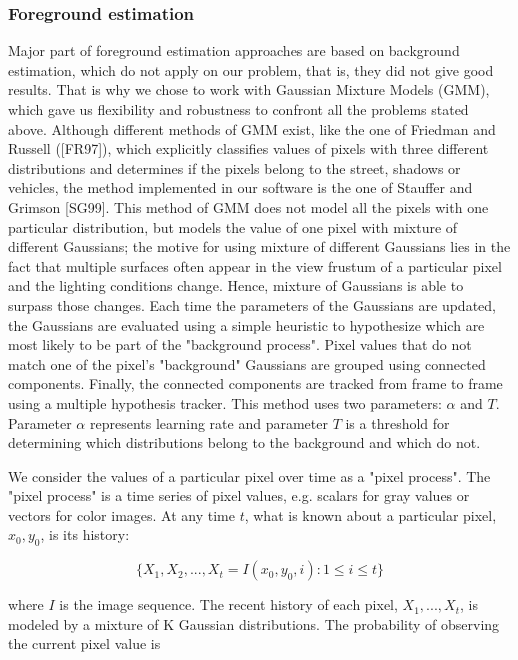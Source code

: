\documentclass[12pt]{article} %
\begin{document}
\subsubsection{Foreground estimation}

Major part of foreground estimation approaches are based on background estimation, which do not apply on our problem, that is, they did not give good results. That is why we chose to work with Gaussian Mixture Models (GMM), which gave us flexibility and robustness to confront all the problems stated above. Although different methods of GMM exist, like the one of Friedman and Russell ([FR97]), which explicitly classifies values of pixels with three different distributions and determines if the pixels belong to the street, shadows or vehicles, the method implemented in our software is the one of Stauffer and Grimson [SG99]. This method of GMM does not model all the pixels with one particular distribution, but models the value of one pixel with mixture of different Gaussians; the motive for using mixture of different Gaussians lies in the fact that  multiple surfaces often appear in the view frustum of a particular pixel and the lighting conditions change. Hence, mixture of Gaussians is able to surpass those changes. Each time the parameters of the Gaussians are updated,
the Gaussians are evaluated using a simple
heuristic to hypothesize which are most likely to be part of the "background process". Pixel values that do not match one of the pixel’s "background" Gaussians are grouped using connected components. Finally, the connected components are tracked from frame to frame using a multiple hypothesis tracker. 
This method uses two parameters: $\alpha$ and $T$. Parameter $\alpha$ represents learning rate and parameter $T$ is a threshold for determining which distributions belong to the background and which do not.  

We consider the values of a particular pixel over
time as a "pixel process". The "pixel process" is a
time series of pixel values, e.g. scalars for gray values or vectors for color images. At any time $t$, what is known about a particular pixel, ${x_{0}, y_{0}}$, is its history:

\begin{equation}
{\{X_{1},X_{2},...,X_{t}} = {I(x_{0},y_{0},i):1\leq i \leq t\}}
\end{equation}

where $I$ is the image sequence. The recent history of each pixel, ${X_{1}, ..., X_{t}}$, is modeled by a mixture of K Gaussian distributions. The probability of observing the current pixel value is
\end{document}
